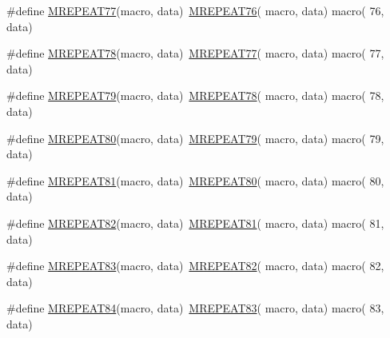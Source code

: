 \begin{DoxyCompactItemize}
\item 
\#define \mbox{\hyperlink{group__group__sam0__utils__mrepeat_ga1831e4c1682945001b9b5fc06dedc788}{M\+R\+E\+P\+E\+A\+T77}}(macro,  data)~\mbox{\hyperlink{group__group__sam0__utils__mrepeat_ga58c5f129a638f3cad65063a67dbdcbb6}{M\+R\+E\+P\+E\+A\+T76}}( macro, data)   macro( 76, data)
\item 
\#define \mbox{\hyperlink{group__group__sam0__utils__mrepeat_ga970169b9fc014f633cefa289e7acc5f7}{M\+R\+E\+P\+E\+A\+T78}}(macro,  data)~\mbox{\hyperlink{group__group__sam0__utils__mrepeat_ga1831e4c1682945001b9b5fc06dedc788}{M\+R\+E\+P\+E\+A\+T77}}( macro, data)   macro( 77, data)
\item 
\#define \mbox{\hyperlink{group__group__sam0__utils__mrepeat_ga8ca389624ac706853a8b95daa9b60074}{M\+R\+E\+P\+E\+A\+T79}}(macro,  data)~\mbox{\hyperlink{group__group__sam0__utils__mrepeat_ga970169b9fc014f633cefa289e7acc5f7}{M\+R\+E\+P\+E\+A\+T78}}( macro, data)   macro( 78, data)
\item 
\#define \mbox{\hyperlink{group__group__sam0__utils__mrepeat_ga4e1ab69f4a649fc9f759f19ddf0150bd}{M\+R\+E\+P\+E\+A\+T80}}(macro,  data)~\mbox{\hyperlink{group__group__sam0__utils__mrepeat_ga8ca389624ac706853a8b95daa9b60074}{M\+R\+E\+P\+E\+A\+T79}}( macro, data)   macro( 79, data)
\item 
\#define \mbox{\hyperlink{group__group__sam0__utils__mrepeat_ga20dda5110c7ee8595742b7493a50fa84}{M\+R\+E\+P\+E\+A\+T81}}(macro,  data)~\mbox{\hyperlink{group__group__sam0__utils__mrepeat_ga4e1ab69f4a649fc9f759f19ddf0150bd}{M\+R\+E\+P\+E\+A\+T80}}( macro, data)   macro( 80, data)
\item 
\#define \mbox{\hyperlink{group__group__sam0__utils__mrepeat_gab614d1a44b41de1264618e26d1f457c6}{M\+R\+E\+P\+E\+A\+T82}}(macro,  data)~\mbox{\hyperlink{group__group__sam0__utils__mrepeat_ga20dda5110c7ee8595742b7493a50fa84}{M\+R\+E\+P\+E\+A\+T81}}( macro, data)   macro( 81, data)
\item 
\#define \mbox{\hyperlink{group__group__sam0__utils__mrepeat_ga05a5bfb2999f879cbf95768b7cc98d8f}{M\+R\+E\+P\+E\+A\+T83}}(macro,  data)~\mbox{\hyperlink{group__group__sam0__utils__mrepeat_gab614d1a44b41de1264618e26d1f457c6}{M\+R\+E\+P\+E\+A\+T82}}( macro, data)   macro( 82, data)
\item 
\#define \mbox{\hyperlink{group__group__sam0__utils__mrepeat_ga8892fab4572ce20132d8237a4fea0f3e}{M\+R\+E\+P\+E\+A\+T84}}(macro,  data)~\mbox{\hyperlink{group__group__sam0__utils__mrepeat_ga05a5bfb2999f879cbf95768b7cc98d8f}{M\+R\+E\+P\+E\+A\+T83}}( macro, data)   macro( 83, data)

\end{DoxyCompactItemize}
